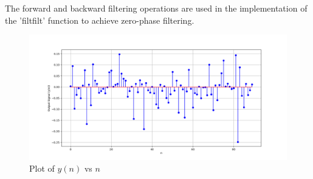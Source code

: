 \documentclass[journal,12pt,twocolumn]{IEEEtran}
\theoremstyle{remark}
\begin{document}
The forward and backward filtering operations are used in the implementation of the 'filtfilt' function to achieve zero-phase filtering.

\begin{figure}[htbp] 
\centering
\includegraphics[width=1.1\columnwidth]{figs/y(n).png}
\caption{Plot of $y(n)$ vs $n$}
\end{figure}
\end{document}
